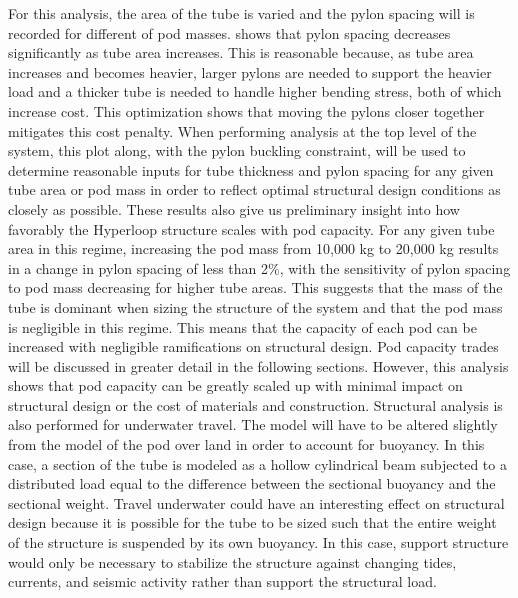 For this analysis, the area of the tube is varied and the pylon spacing will is
recorded for different of pod masses. 
shows that pylon spacing decreases significantly as tube area increases.
This is reasonable because, as tube area increases and becomes heavier, larger
pylons are needed to support the heavier load and a thicker tube is needed to
handle higher bending stress, both of which increase cost. This optimization
shows that moving the pylons closer together mitigates this cost penalty.
When performing analysis at the top level of the system, this plot along,
with the pylon buckling constraint, will be used to determine reasonable inputs
for tube thickness and pylon spacing for any given tube area or pod mass in
order to reflect optimal structural design conditions as closely as possible.
These results also give us preliminary insight into how favorably the Hyperloop
structure scales with pod capacity. For any given tube area in this regime,
increasing the pod mass from 10,000 kg to 20,000 kg results in a change in
pylon spacing of less than 2\%, with the sensitivity of pylon spacing to pod
mass decreasing for higher tube areas. This suggests that the mass of the tube
is dominant when sizing the structure of the system and that the pod mass is
negligible in this regime. This means that the capacity of each pod can be
increased with negligible ramifications on structural design. Pod capacity
trades will be discussed in greater detail in the following sections. However,
this analysis shows that pod capacity can be greatly scaled up with minimal
impact on structural design or the cost of materials and construction.
Structural analysis is also performed for underwater travel.
The model will have to be altered slightly from the model of the pod over land
in order to account for buoyancy. In this case, a section of the tube is
modeled as a hollow cylindrical beam subjected to a distributed load equal to
the difference between the sectional buoyancy and the sectional weight.
Travel underwater could have an interesting effect on structural design because
it is possible for the tube to be sized such that the entire weight of the
structure is suspended by its own buoyancy. In this case, support structure
would only be necessary to stabilize the structure against changing tides,
currents, and seismic activity rather than support the structural load.

